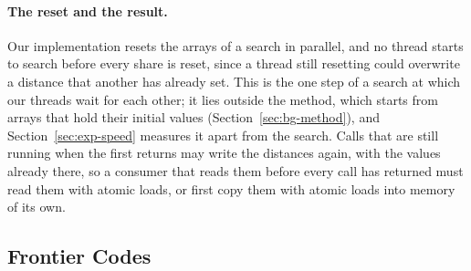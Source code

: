 \paragraph{The reset and the result.} Our implementation resets the arrays of a search in parallel, and no thread starts to search before every share is reset, since a thread still resetting could overwrite a distance that another has already set. This is the one step of a search at which our threads wait for each other; it lies outside the method, which starts from arrays that hold their initial values (Section~\ref{sec:bg-method}), and Section~\ref{sec:exp-speed} measures it apart from the search. Calls that are still running when the first returns may write the distances again, with the values already there, so a consumer that reads them before every call has returned must read them with atomic loads, or first copy them with atomic loads into memory of its own.

\subsection{Frontier Codes}
\label{sec:impl-codes}

